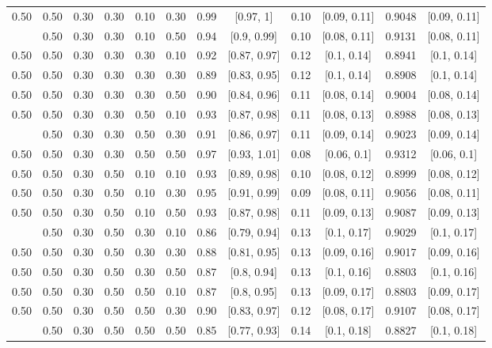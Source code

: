 \documentclass[
  11pt,
]{article}
\begin{document}
\begin{landscape}
\begin{ThreePartTable}
\begin{longtable}[t]{cccccccccccc}
0.50 & 0.50 & 0.30 & 0.30 & 0.10 & 0.30 & 0.99 & {}[0.97, 1] & 0.10 & {}[0.09, 0.11] & 0.9048 & {}[0.09, 0.11]\\
\addlinespace
0.50 & 0.50 & 0.30 & 0.30 & 0.10 & 0.50 & 0.94 & {}[0.9, 0.99] & 0.10 & {}[0.08, 0.11] & 0.9131 & {}[0.08, 0.11]\\
0.50 & 0.50 & 0.30 & 0.30 & 0.30 & 0.10 & 0.92 & {}[0.87, 0.97] & 0.12 & {}[0.1, 0.14] & 0.8941 & {}[0.1, 0.14]\\
0.50 & 0.50 & 0.30 & 0.30 & 0.30 & 0.30 & 0.89 & {}[0.83, 0.95] & 0.12 & {}[0.1, 0.14] & 0.8908 & {}[0.1, 0.14]\\
0.50 & 0.50 & 0.30 & 0.30 & 0.30 & 0.50 & 0.90 & {}[0.84, 0.96] & 0.11 & {}[0.08, 0.14] & 0.9004 & {}[0.08, 0.14]\\
0.50 & 0.50 & 0.30 & 0.30 & 0.50 & 0.10 & 0.93 & {}[0.87, 0.98] & 0.11 & {}[0.08, 0.13] & 0.8988 & {}[0.08, 0.13]\\
\addlinespace
0.50 & 0.50 & 0.30 & 0.30 & 0.50 & 0.30 & 0.91 & {}[0.86, 0.97] & 0.11 & {}[0.09, 0.14] & 0.9023 & {}[0.09, 0.14]\\
0.50 & 0.50 & 0.30 & 0.30 & 0.50 & 0.50 & 0.97 & {}[0.93, 1.01] & 0.08 & {}[0.06, 0.1] & 0.9312 & {}[0.06, 0.1]\\
0.50 & 0.50 & 0.30 & 0.50 & 0.10 & 0.10 & 0.93 & {}[0.89, 0.98] & 0.10 & {}[0.08, 0.12] & 0.8999 & {}[0.08, 0.12]\\
0.50 & 0.50 & 0.30 & 0.50 & 0.10 & 0.30 & 0.95 & {}[0.91, 0.99] & 0.09 & {}[0.08, 0.11] & 0.9056 & {}[0.08, 0.11]\\
0.50 & 0.50 & 0.30 & 0.50 & 0.10 & 0.50 & 0.93 & {}[0.87, 0.98] & 0.11 & {}[0.09, 0.13] & 0.9087 & {}[0.09, 0.13]\\
\addlinespace
0.50 & 0.50 & 0.30 & 0.50 & 0.30 & 0.10 & 0.86 & {}[0.79, 0.94] & 0.13 & {}[0.1, 0.17] & 0.9029 & {}[0.1, 0.17]\\
0.50 & 0.50 & 0.30 & 0.50 & 0.30 & 0.30 & 0.88 & {}[0.81, 0.95] & 0.13 & {}[0.09, 0.16] & 0.9017 & {}[0.09, 0.16]\\
0.50 & 0.50 & 0.30 & 0.50 & 0.30 & 0.50 & 0.87 & {}[0.8, 0.94] & 0.13 & {}[0.1, 0.16] & 0.8803 & {}[0.1, 0.16]\\
0.50 & 0.50 & 0.30 & 0.50 & 0.50 & 0.10 & 0.87 & {}[0.8, 0.95] & 0.13 & {}[0.09, 0.17] & 0.8803 & {}[0.09, 0.17]\\
0.50 & 0.50 & 0.30 & 0.50 & 0.50 & 0.30 & 0.90 & {}[0.83, 0.97] & 0.12 & {}[0.08, 0.17] & 0.9107 & {}[0.08, 0.17]\\
\addlinespace
0.50 & 0.50 & 0.30 & 0.50 & 0.50 & 0.50 & 0.85 & {}[0.77, 0.93] & 0.14 & {}[0.1, 0.18] & 0.8827 & {}[0.1, 0.18]\\

\end{longtable}
\end{ThreePartTable}
\end{landscape}
\end{document}
